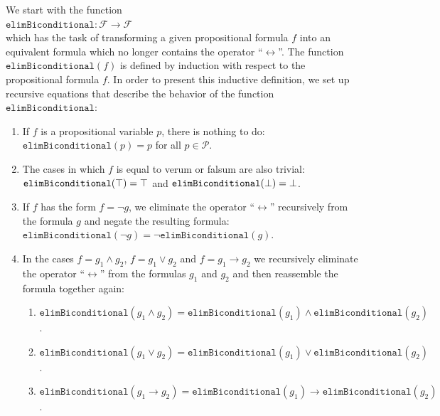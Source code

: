 \noindent
We start with the
function 
\\[0.2cm]
\hspace*{1.3cm}
$\texttt{elimBiconditional}: \mathcal{F} \rightarrow \mathcal{F}$
\\[0.2cm]
which has the task of transforming a given propositional formula $f$ into an equivalent formula
which no longer contains the operator ``$\leftrightarrow$''.  The function
$\texttt{elimBiconditional}(f)$ is defined by induction with respect to the propositional formula $f$.
In order to present this inductive definition, we set up recursive equations
that describe the behavior of the function $\texttt{elimBiconditional}$:
\begin{enumerate}
\item If $f$ is a propositional variable $p$, there is nothing to do:
      \\[0.2cm]
      \hspace*{1.3cm}
      $\texttt{elimBiconditional}(p) = p$ \quad for all $p \in \mathcal{P}$.
\item The cases in which $f$ is equal to verum or  falsum are also trivial:
      \\[0.2cm]
      \hspace*{1.3cm}
      $\texttt{elimBiconditional}(\top) = \top$ \quad and \quad
      $\texttt{elimBiconditional}(\bot) = \bot$.
\item If $f$ has the form $f = \neg g$, we eliminate the operator
      ``$\leftrightarrow$'' recursively from the formula $g$ and negate the resulting formula: \\[0.2cm]
      \hspace*{1.3cm} 
      $\texttt{elimBiconditional}(\neg g) = \neg \texttt{elimBiconditional}(g)$.
\item In the cases $f = g_1 \wedge g_2$, $f = g_1 \vee g_2$ and $f = g_1 \rightarrow g_2$ we 
      recursively eliminate the operator ``$\leftrightarrow$'' from the formulas $g_1$ and $g_2$ and then reassemble the formula
      together again: 
      \begin{enumerate}
      \item $\texttt{elimBiconditional}(g_1 \wedge g_2) = \texttt{elimBiconditional}(g_1) \wedge \texttt{elimBiconditional}(g_2)$.
      \item $\texttt{elimBiconditional}(g_1 \vee g_2) = \texttt{elimBiconditional}(g_1) \vee \texttt{elimBiconditional}(g_2)$.
      \item $\texttt{elimBiconditional}(g_1 \rightarrow g_2) = \texttt{elimBiconditional}(g_1) \rightarrow \texttt{elimBiconditional}(g_2)$.

\end{enumerate}
\end{enumerate}
